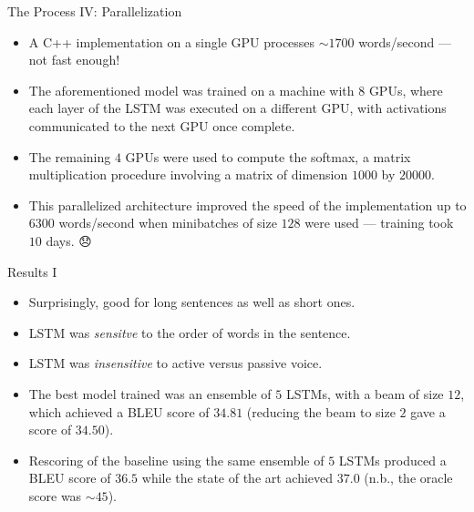 \documentclass{beamer}
\begin{document}

\begin{frame}{The Process IV: Parallelization}

\begin{itemize}
  \itemsep10pt
  \item A \textsc{C++} implementation on a single GPU processes $\sim 1700$
    words/second --- not fast enough!
  \item The aforementioned model was trained on a machine with $8$ GPUs, where
    each layer of the LSTM was executed on a different GPU, with activations
    communicated to the next GPU once complete.
  \item The remaining $4$ GPUs were used to compute the softmax, a matrix
    multiplication procedure involving a matrix of dimension $1000$ by $20000$.
  \item This parallelized architecture improved the speed of the implementation
    up to $6300$ words/second when minibatches of size $128$ were used ---
    training took $10$ days. 😞
\end{itemize}

\end{frame}


\begin{frame}{Results I}

\begin{itemize}
  \itemsep10pt
  \item Surprisingly, good for long sentences as well as short ones.
  \item LSTM was \textit{sensitve} to the order of words in the sentence.
  \item LSTM was \textit{insensitive} to active versus passive voice.
  \item The best model trained was an ensemble of $5$ LSTMs, with a beam of size
    $12$, which achieved a BLEU score of $34.81$ (reducing the beam to size $2$
    gave a score of $34.50$).
  \item Rescoring of the baseline using the same ensemble of $5$ LSTMs produced
    a BLEU score of $36.5$ while the state of the art achieved $37.0$ (n.b.,
    the oracle score was $\sim 45$).
\end{itemize}

\end{frame}
\end{document}
